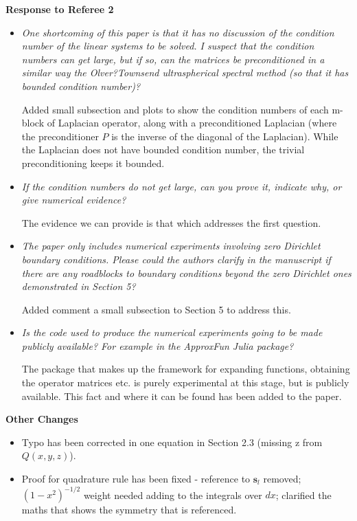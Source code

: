\documentclass[10pt]{letter}
\newcommand{\comment}[1]{\textit{\color{bluey}#1}}
\newcommand{\bstodoinline}{\todo[color=pink,inline=true]}
\begin{document}
\bigskip 

\centerline{\textbf{Response to Referee 2}}

\begin{itemize}[parsep=1em,leftmargin=1em]

\item \comment{One shortcoming of this paper is that it has no discussion of the condition number of the linear systems to be solved. I suspect that the condition numbers can get large, but if so, can the matrices be preconditioned in a similar way the Olver?Townsend ultraspherical spectral method (so that it has bounded condition number)?}

Added small subsection and plots to show the condition numbers of each m-block of Laplacian operator, along with a preconditioned Laplacian (where the preconditioner $P$ is the inverse of the diagonal of the Laplacian). While the Laplacian does not have bounded condition number, the trivial preconditioning keeps it bounded.


\item \comment{If the condition numbers do not get large, can you prove it, indicate why, or give numerical evidence?}

The evidence we can provide is that which addresses the first question.


\item \comment{The paper only includes numerical experiments involving zero Dirichlet boundary conditions. Please could the authors clarify in the manuscript if there are any roadblocks to boundary conditions beyond the zero Dirichlet ones demonstrated in Section 5?}

Added comment a small subsection to Section 5 to address this. \bstodoinline{Is this enough?}


\item \comment{Is the code used to produce the numerical experiments going to be made publicly available? For example in the ApproxFun Julia package?}

The package that makes up the framework for expanding functions, obtaining the operator matrices etc. is purely experimental at this stage, but is publicly available. This fact and where it can be found has been added to the paper.


\end{itemize}


\bigskip

\centerline{\textbf{Other Changes}}

\begin{itemize}[parsep=1em,leftmargin=1em]
	\item Typo has been corrected in one equation in Section 2.3 (missing z from $Q(x,y,z)$).
	\item Proof for quadrature rule has been fixed - reference to $\bm{s}_l$ removed; $(1-x^2)^{-1/2}$ weight needed adding to the integrals over $dx$; clarified the maths that shows the symmetry that is referenced.
\end{itemize}
\end{document}
